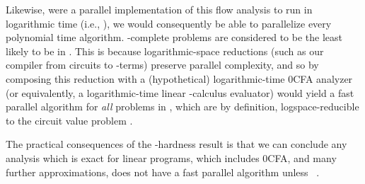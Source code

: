 Likewise, were a parallel implementation of this flow analysis to run
in logarithmic time (i.e., \nc), we would consequently be able to
parallelize every polynomial time algorithm.  \ptime-complete problems
are considered to be the least likely to be in \nc.  This is because
logarithmic-space reductions (such as our compiler from circuits to
-terms) preserve parallel complexity, and so by composing
this reduction with a (hypothetical) logarithmic-time 0CFA analyzer
(or equivalently, a logarithmic-time linear -calculus
evaluator) would yield a fast parallel algorithm for {\em all}
problems in \ptime, which are by definition, logspace-reducible to the
circuit value problem \cite[page 377]{Papadimitriou94}.

The practical consequences of the \ptime-hardness result is that we
can conclude any analysis which is exact for linear programs, which
includes 0CFA, and many further approximations, does not have a fast
parallel algorithm unless \ptime\  \nc.
